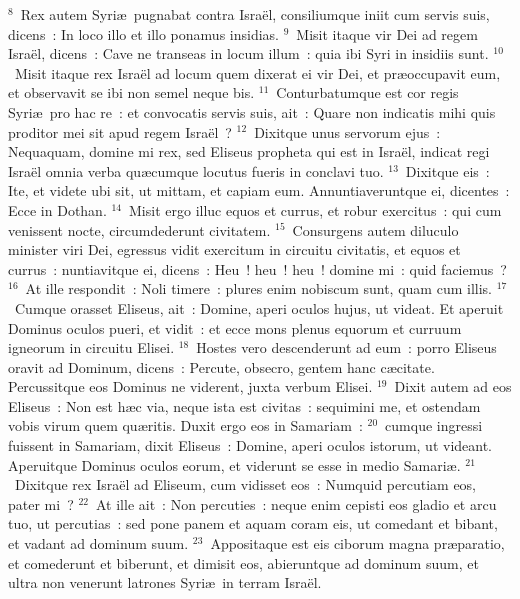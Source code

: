 ${}^{8}$~Rex autem Syri\ae\ pugnabat contra Isra\"el, consiliumque iniit cum servis suis, dicens~: In loco illo et illo ponamus insidias.
${}^{9}$~Misit itaque vir Dei ad regem Isra\"el, dicens~: Cave ne transeas in locum illum~: quia ibi Syri in insidiis sunt.
${}^{10}$~Misit itaque rex Isra\"el ad locum quem dixerat ei vir Dei, et pr\ae occupavit eum, et observavit se ibi non semel neque bis.
${}^{11}$~Conturbatumque est cor regis Syri\ae\ pro hac re~: et convocatis servis suis, ait~: Quare non indicatis mihi quis proditor mei sit apud regem Isra\"el~?
${}^{12}$~Dixitque unus servorum ejus~: Nequaquam, domine mi rex, sed Eliseus propheta qui est in Isra\"el, indicat regi Isra\"el omnia verba qu\ae cumque locutus fueris in conclavi tuo.
${}^{13}$~Dixitque eis~: Ite, et videte ubi sit, ut mittam, et capiam eum. Annuntiaveruntque ei, dicentes~: Ecce in Dothan.
${}^{14}$~Misit ergo illuc equos et currus, et robur exercitus~: qui cum venissent nocte, circumdederunt civitatem.
${}^{15}$~Consurgens autem diluculo minister viri Dei, egressus vidit exercitum in circuitu civitatis, et equos et currus~: nuntiavitque ei, dicens~: Heu~! heu~! heu~! domine mi~: quid faciemus~?
${}^{16}$~At ille respondit~: Noli timere~: plures enim nobiscum sunt, quam cum illis.
${}^{17}$~Cumque orasset Eliseus, ait~: Domine, aperi oculos hujus, ut videat. Et aperuit Dominus oculos pueri, et vidit~: et ecce mons plenus equorum et curruum igneorum in circuitu Elisei.
${}^{18}$~Hostes vero descenderunt ad eum~: porro Eliseus oravit ad Dominum, dicens~: Percute, obsecro, gentem hanc c\ae citate. Percussitque eos Dominus ne viderent, juxta verbum Elisei.
${}^{19}$~Dixit autem ad eos Eliseus~: Non est h\ae c via, neque ista est civitas~: sequimini me, et ostendam vobis virum quem qu\ae ritis. Duxit ergo eos in Samariam~:
${}^{20}$~cumque ingressi fuissent in Samariam, dixit Eliseus~: Domine, aperi oculos istorum, ut videant. Aperuitque Dominus oculos eorum, et viderunt se esse in medio Samari\ae .
${}^{21}$~Dixitque rex Isra\"el ad Eliseum, cum vidisset eos~: Numquid percutiam eos, pater mi~?
${}^{22}$~At ille ait~: Non percuties~: neque enim cepisti eos gladio et arcu tuo, ut percutias~: sed pone panem et aquam coram eis, ut comedant et bibant, et vadant ad dominum suum.
${}^{23}$~Appositaque est eis ciborum magna pr\ae paratio, et comederunt et biberunt, et dimisit eos, abieruntque ad dominum suum, et ultra non venerunt latrones Syri\ae\ in terram Isra\"el.


